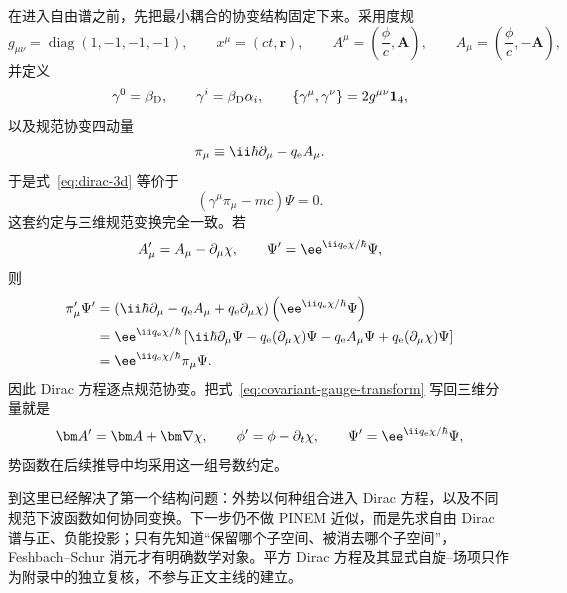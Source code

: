 在进入自由谱之前，先把最小耦合的协变结构固定下来。采用度规
\begin{equation}
 g_{\mu\nu}=\operatorname{diag}(1,-1,-1,-1),
 \qquad
 x^\mu=(ct,\bm r),
 \qquad
 A^\mu=\left(\frac{\phi}{c},\bm A\right),
 \qquad
 A_\mu=\left(\frac{\phi}{c},-\bm A\right),
 \label{eq:covariant-conventions}
\end{equation}
并定义
\begin{equation}
 \gamma^0=\beta_{\rm D},
 \qquad
 \gamma^i=\beta_{\rm D}\alpha_i,
 \qquad
 \{\gamma^\mu,\gamma^\nu\}=2g^{\mu\nu}\mathbf 1_4,
 \label{eq:gamma-def-clifford}
\end{equation}
以及规范协变四动量
\begin{equation}
 \pi_\mu\equiv \ii\hbar\partial_\mu-q_{\rm e}A_\mu.
 \label{eq:covariant-pi}
\end{equation}
于是式~\eqref{eq:dirac-3d} 等价于
\begin{equation}
 \boxed{\left(\gamma^\mu\pi_\mu-mc\right)\Psi=0.}
 \label{eq:dirac-covariant}
\end{equation}
这套约定与三维规范变换完全一致。若
\begin{equation}
 A_\mu' = A_\mu-\partial_\mu\chi,
 \qquad
 \Psi'=\ee^{\ii q_{\rm e}\chi/\hbar}\Psi,
 \label{eq:covariant-gauge-transform}
\end{equation}
则
\begin{align}
 \pi_\mu'\Psi'
 &=\left(\ii\hbar\partial_\mu-q_{\rm e}A_\mu+q_{\rm e}\partial_\mu\chi\right)
 \left(\ee^{\ii q_{\rm e}\chi/\hbar}\Psi\right)\\
 &=\ee^{\ii q_{\rm e}\chi/\hbar}
 \left[\ii\hbar\partial_\mu\Psi-q_{\rm e}(\partial_\mu\chi)\Psi
 -q_{\rm e}A_\mu\Psi+q_{\rm e}(\partial_\mu\chi)\Psi\right]\\
 &=\ee^{\ii q_{\rm e}\chi/\hbar}\pi_\mu\Psi.
 \label{eq:pi-gauge-covariance}
\end{align}
因此 Dirac 方程逐点规范协变。把式~\eqref{eq:covariant-gauge-transform} 写回三维分量就是
\begin{equation}
 \bm A'=\bm A+\bm\nabla\chi,
 \qquad
 \phi'=\phi-\partial_t\chi,
 \qquad
 \Psi'=\ee^{\ii q_{\rm e}\chi/\hbar}\Psi,
 \label{eq:gauge-three-components}
\end{equation}
势函数在后续推导中均采用这一组号数约定。

到这里已经解决了第一个结构问题：外势以何种组合进入 Dirac 方程，以及不同规范下波函数如何协同变换。下一步仍不做 PINEM 近似，而是先求自由 Dirac 谱与正、负能投影；只有先知道“保留哪个子空间、被消去哪个子空间”，Feshbach--Schur 消元才有明确数学对象。平方 Dirac 方程及其显式自旋--场项只作为附录中的独立复核，不参与正文主线的建立。


